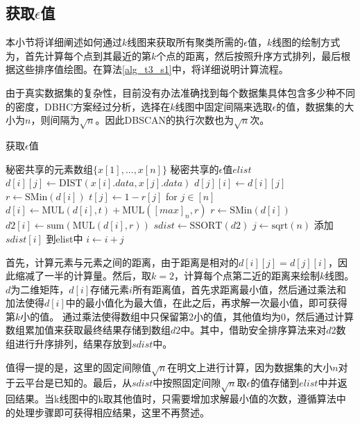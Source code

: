 \subsection{获取$\epsilon$值}
本小节将详细阐述如何通过$ k $线图来获取所有聚类所需的$\epsilon$值，$ k $线图的绘制方式为，首先计算每个点到其最近的第$ k $个点的距离，然后按照升序方式排列，最后根据这些排序值绘图。在算法\ref{alg_t3_s1}中，将详细说明计算流程。

由于真实数据集的复杂性，目前没有办法准确找到每个数据集具体包含多少种不同的密度，DBHC方案\cite{latifi2021dbhc}经过分析，选择在$ k $线图中固定间隔来选取$\epsilon$的值，数据集的大小为$ n $，则间隔为$ \sqrt{n} $。因此DBSCAN的执行次数也为$ \sqrt{n} $次。

\begin{algorithm}[htbp]
	\renewcommand{\algorithmicrequire}{\textbf{输入:}}
	\renewcommand{\algorithmicensure}{\textbf{输出:}}
	\caption{获取$\epsilon$值}
	\label{alg_t3_s1}
	\begin{algorithmic}[1]
		\REQUIRE 秘密共享的元素数组$ \{x[1],...,x[n]\} $
		\ENSURE 秘密共享的$\epsilon$值$ elist $
		\STATE $ d[i][j] \leftarrow \text{DIST}(x[i].data, x[j].data) $
		\STATE $ d[j][i] \leftarrow d[i][j] $
		\ENDFOR
		\ENDFOR
		\STATE $ r \leftarrow \text{SMin}(d[i]) $ %
		\STATE $ t[j] \leftarrow 1-r[j] $ for $ j\in[n] $
		\STATE $ d[i] \leftarrow \text{MUL}(d[i], t) + \text{MUL}([max]_n, r) $
		\STATE $ r \leftarrow \text{SMin}(d[i]) $
		\STATE $ d2[i] \leftarrow \text{sum}(\text{MUL}(d[i], r)) $ %
		\ENDFOR
		\STATE $ sdist \leftarrow \text{SSORT}(d2) $
		\STATE $ j \leftarrow \text{sqrt}(n) $
		\STATE 添加 $ sdist[i] $ 到elist中
		\STATE $ i \leftarrow i + j $
		\ENDFOR
	\end{algorithmic}
\end{algorithm}

首先，计算元素与元素之间的距离，由于距离是相对的$ d[i][j]=d[j][i] $，因此缩减了一半的计算量。然后，取$ k=2 $，计算每个点第二近的距离来绘制$ k $线图。$ d $为二维矩阵，$ d[i] $存储元素$ i $所有距离值，首先求距离最小值，然后通过乘法和加法使得$ d[i] $中的最小值化为最大值，在此之后，再求解一次最小值，即可获得第$ k $小的值。
通过乘法使得数组中只保留第2小的值，其他值均为0，然后通过计算数组累加值来获取最终结果存储到数组$ d2 $中。其中，借助安全排序算法来对$ d2 $数组进行升序排列，结果存放到$ sdist $中。

值得一提的是，这里的固定间隙值$ \sqrt{n} $在明文上进行计算，因为数据集的大小$ n $对于云平台是已知的。最后，从$ sdist $中按照固定间隙$ \sqrt{n} $取$\epsilon$的值存储到$ elist $中并返回结果。当k线图中的k取其他值时，只需要增加求解最小值的次数，遵循算法中的处理步骤即可获得相应结果，这里不再赘述。


